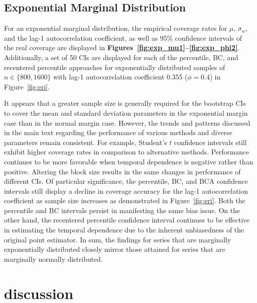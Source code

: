 \documentclass[10pt]{article}
\newcommand{\eds}[1]{\textcolor{red}{EDS: (#1)}}
\newcommand{\mc}[1]{\textcolor{orange}{MC: (#1)}}
\begin{document}
\subsection*{Exponential Marginal Distribution}
For an exponential marginal distribution, the empirical coverage rates for 
$\mu$, $\sigma_w$, %
and 
the lag-1 autocorrelation coefficient, %
as well as 95\%
confidence intervals of the real coverage are displayed in 
\textbf{Figures~\ref{fig:exp_mu1}--\ref{fig:exp_phi2}}. 
Additionally, a set of 50 CIs are displayed for each of the percentile, 
BC, and recentered percentile approaches for exponentially distributed
samples of $n \in \{800, 1600\}$ with lag-1 autocorrelation coefficient 0.355
($\phi = 0.4$) in Figure~\ref{fig:eri}.


It appears that a greater sample size is generally required for the bootstrap
CIs to cover the mean and standard deviation parameters in the exponential
margin case than in the normal margin case. However, the trends and patterns
discussed in the main text regarding the performance of various methods and
diverse parameters remain consistent. For example, Student's $t$ confidence
intervals still exhibit higher coverage rates in comparison to alternative
methods. Performance continues to be more favorable when temporal dependence is
negative rather than positive. Altering the block size results in the same 
changes in performance of different CIs. Of particular significance, the 
percentile, BC,
and BCA confidence intervals still display a decline in coverage accuracy for
the lag-1 autocorrelation coefficient as sample size increases as demonstrated
in Figure~\ref{fig:eri}. Both the percentile and BC intervals persist in
manifesting the same bias issue. On the other hand, the recentered percentile
confidence interval continues to be effective in estimating the temporal 
dependence %
due to the
inherent unbiasedness of the original point estimator. In sum, the findings for
series that are marginally exponentially distributed closely mirror those
attained for series that are marginally normally distributed.


\section*{discussion}
\label{sec:disc}
\end{document}
